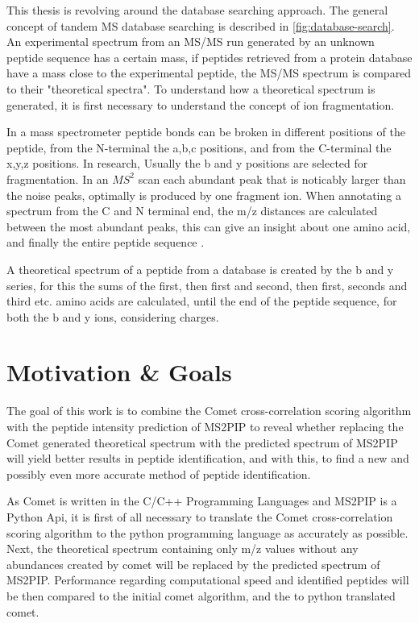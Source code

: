 \documentclass[11pt]{article}
\begin{document}
This thesis is revolving around the database searching approach. The general concept of tandem MS database searching is described in \cref{fig:database-search}. An experimental spectrum from an MS/MS run generated by an unknown peptide sequence has a certain mass, if peptides retrieved from a protein database have a mass close to the experimental peptide, the MS/MS spectrum is compared to their "theoretical spectra". To understand how a theoretical spectrum is generated, it is first necessary to understand the concept of ion fragmentation. 

In a mass spectrometer peptide bonds can be broken in different positions of the peptide, from the N-terminal the a,b,c positions, and from the C-terminal the x,y,z positions. In research, Usually the b and y positions are selected for fragmentation. In an \(MS^2\) scan each abundant peak that is noticably larger than the noise peaks, optimally is produced by one fragment ion. When annotating a spectrum from the C and N terminal end, the m/z distances are calculated between the most abundant peaks, this can give an insight about one amino acid, and finally the entire peptide sequence \cite{b-y-ions}.

A theoretical spectrum of a peptide from a database is created by the b and y series, for this the sums of the first, then first and second, then first, seconds and third etc. amino acids are calculated, until the end of the peptide sequence, for both the b and y ions, considering charges.

\newpage
% 
\section{Motivation \& Goals}
The goal of this work is to combine the Comet cross-correlation scoring algorithm
with the peptide intensity prediction of MS2PIP to reveal whether replacing the Comet generated theoretical spectrum with the predicted spectrum of MS2PIP will yield better results in peptide identification, and with this, to find a new and possibly even more accurate method of peptide identification.

As Comet is written in the C/C++ Programming Languages and MS2PIP is a Python Api, it is first of all necessary to translate the Comet cross-correlation scoring algorithm to the python programming language as accurately as possible. Next, the theoretical spectrum containing only m/z values without any abundances created by comet will be replaced by the predicted spectrum of MS2PIP. Performance regarding computational speed and identified peptides will be then compared to the initial comet algorithm, and the to python translated comet. 
\end{document}
